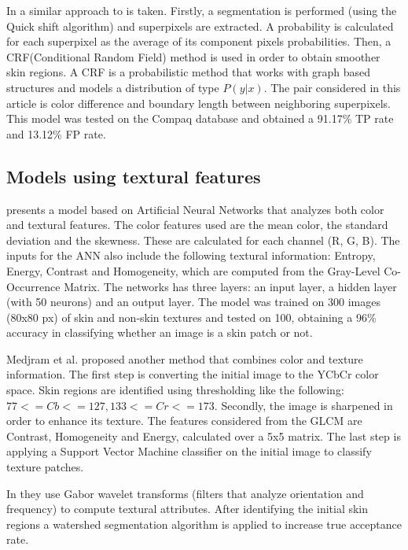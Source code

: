 \documentclass[12pt]{report}
\begin{document}
 	In \cite{superpixels_applied_2} a similar approach to \cite{superpixels_applied_1} is taken. Firstly, a segmentation is performed (using the Quick shift algorithm) and superpixels are extracted. A probability is calculated for each superpixel as the average of its component pixels probabilities. Then, a CRF(Conditional Random Field) method is used in order to obtain smoother skin regions. A CRF is a probabilistic method that works with graph based structures and models a distribution of type $P(y|x)$. The pair considered in this article is color difference and boundary length between neighboring superpixels. This model was tested on the Compaq database and obtained a 91.17\% TP rate and 13.12\% FP rate.
 	
 	\subsection{Models using textural features}
 	\cite{color_texture_ann} presents a model based on Artificial Neural Networks that analyzes both color and textural features. The color features used are the mean color, the standard deviation and the skewness. These are calculated for each channel (R, G, B). The inputs for the ANN also include the following textural information: Entropy, Energy, Contrast and Homogeneity, which are computed from the Gray-Level Co-Occurrence Matrix. The networks has three layers: an input layer, a hidden layer (with 50 neurons) and an output layer. The model was trained on 300 images (80x80 px) of skin and non-skin textures and tested on 100, obtaining a 96\% accuracy in classifying whether an image is a skin patch or not.
 	
 	Medjram et al.\cite{texture_svm} proposed another method that combines color and texture information. The first step is converting the initial image to the YCbCr color space. Skin regions are identified using thresholding like the following: \(77 <= Cb <= 127, 133 <= Cr <= 173\). Secondly, the image is sharpened in order to enhance its texture. The features considered from the GLCM are Contrast, Homogeneity and Energy, calculated over a 5x5 matrix. The last step is applying a Support Vector Machine classifier on the initial image to classify texture patches.
 	
 	In \cite{texture_gabor_wavelet} they use Gabor wavelet transforms (filters that analyze orientation and frequency) to compute textural attributes. After identifying the initial skin regions a watershed segmentation algorithm is applied to increase true acceptance rate.
 	
\end{document}
